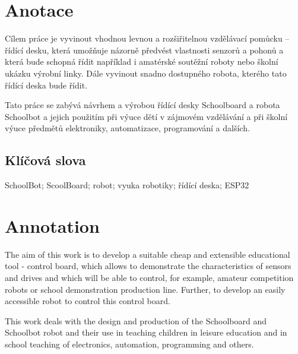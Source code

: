 \documentclass{template/socthesis}
\author{Tomáš Vavrinec}
\begin{document}
\maketitle



\pagestyle{empty}

\section*{Anotace}

Cílem práce je  vyvinout vhodnou levnou a rozšiřitelnou vzdělávací pomůcku -- řídící desku, která umožňuje názorně předvést vlastnosti senzorů a pohonů a která bude schopná řídit například i amatérské soutěžní roboty nebo školní ukázku výrobní linky. Dále vyvinout snadno dostupného robota, kterého tato řídící deska bude řídit.

Tato práce se zabývá návrhem a výrobou řídící desky Schoolboard a robota Schoolbot a jejich použitím při výuce dětí v zájmovém vzdělávání a při školní výuce předmětů elektroniky, automatizace, programování a dalších. 

\subsection*{Klíčová slova}
SchoolBot; ScoolBoard; robot; vyuka robotiky; řídící deska; ESP32

\vspace{20mm}

\section*{Annotation}

The aim of this work is to develop a suitable cheap and extensible educational tool - control board, which allows to demonstrate the characteristics of sensors and drives and which will be able to control, for example, amateur competition robots or school demonstration production line. Further, to develop an easily accessible robot to control this control board.

This work deals with the design and production of the Schoolboard and Schoolbot robot and their use in teaching children in leisure education and in school teaching of electronics, automation, programming and others.
\end{document}
